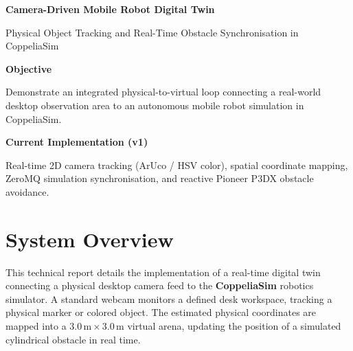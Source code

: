 \documentclass[10pt,a4paper]{article}
\begin{document}

\begin{center}
    {\LARGE\bfseries\color{navy}
    Camera-Driven Mobile Robot Digital Twin}

    \vspace{2pt}

    {\small\color{greytext}
    Physical Object Tracking and Real-Time Obstacle Synchronisation in CoppeliaSim}
\end{center}

\vspace{-4pt}


\begin{tcolorbox}[
    colback=lightblue,
    colframe=borderblue,
    boxrule=0.6pt,
    arc=1.5mm,
    left=6pt,
    right=6pt,
    top=3pt,
    bottom=3pt
]
\begin{minipage}[t]{0.48\linewidth}
\textbf{\color{navy}Objective}

Demonstrate an integrated physical-to-virtual loop connecting a real-world desktop observation area to an autonomous mobile robot simulation in CoppeliaSim.
\end{minipage}
\hfill
\begin{minipage}[t]{0.48\linewidth}
\textbf{\color{navy}Current Implementation (v1)}

Real-time 2D camera tracking (ArUco / HSV color), spatial coordinate mapping, ZeroMQ simulation synchronisation, and reactive Pioneer P3DX obstacle avoidance.
\end{minipage}
\end{tcolorbox}

\vspace{-4pt}

\section{System Overview}

This technical report details the implementation of a real-time digital twin connecting a physical desktop camera feed to the \textbf{CoppeliaSim} robotics simulator. A standard webcam monitors a defined desk workspace, tracking a physical marker or colored object. The estimated physical coordinates are mapped into a $3.0\,\mathrm{m}\times3.0\,\mathrm{m}$ virtual arena, updating the position of a simulated cylindrical obstacle in real time.
\end{document}
